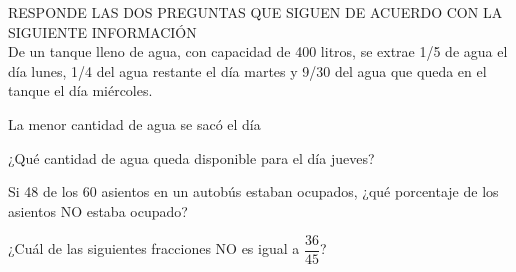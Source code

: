 \documentclass[letterpaper,10pt]{examdesign}
\begin{document}
\begin{multiplechoice}[keycolumns=4,examcolumns=2]
\begin{block}
\begin{question}
\end{question}
\end{block}
\begin{block}
RESPONDE LAS DOS PREGUNTAS QUE SIGUEN DE ACUERDO CON LA SIGUIENTE INFORMACIÓN\\
De un tanque lleno de agua, con capacidad de 400 litros, se extrae 1/5  de agua el día lunes, 1/4 del agua restante el día martes y 9/30 del agua que queda en el tanque el día miércoles.
\begin{question}
La menor cantidad de agua se sacó el día
\end{question}
\begin{question}
¿Qué cantidad de agua queda disponible para el día jueves?
\end{question}
\end{block}
\begin{question}
Si 48 de los 60 asientos en un autobús estaban ocupados, ¿qué porcentaje de los asientos NO estaba ocupado?
\end{question}
\begin{question}
¿Cuál de las siguientes fracciones NO es igual a $\dfrac{36}{45}$?
\end{question}
\end{multiplechoice}
\end{document}

